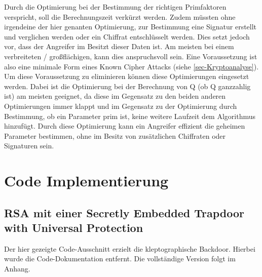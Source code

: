             Durch die Optimierung bei der Bestimmung der richtigen Primfaktoren verspricht, soll die Berechnungszeit verkürzt werden. Zudem müssten ohne irgendeine der hier genanten Optimierung, zur Bestimmung eine Signatur erstellt und verglichen werden oder ein Chiffrat entschlüsselt werden. Dies setzt jedoch vor, dass der Angreifer im Besitzt dieser Daten ist. Am meisten bei einem verbreiteten / großflächigen, kann dies anspruchsvoll sein. Eine Voraussetzung ist also eine minimale Form eines Known Cipher Attacks (siehe \ref{sec-Kryptoanalyse}).
            Um diese Voraussetzung zu eliminieren können diese Optimierungen eingesetzt werden. 
            Dabei ist die Optimierung bei der Berechnung von Q (ob Q ganzzahlig ist) am meisten geeignet, da diese im Gegensatz zu den beiden anderen Optimierungen immer klappt und im Gegensatz zu der Optimierung durch Bestimmung, ob ein Parameter prim ist, keine weitere Laufzeit dem Algorithmus hinzufügt.
            Durch diese Optimierung kann ein Angreifer effizient die geheimen Parameter bestimmen, ohne im Besitz von zusätzlichen Chiffraten oder Signaturen sein.

        
    \section{Code Implementierung}
        \subsection{RSA mit einer Secretly Embedded Trapdoor with Universal Protection}

        Der hier gezeigte Code-Ausschnitt erzielt die kleptographische Backdoor. Hierbei wurde die Code-Dokumentation entfernt. Die vollständige Version folgt im Anhang.
       
